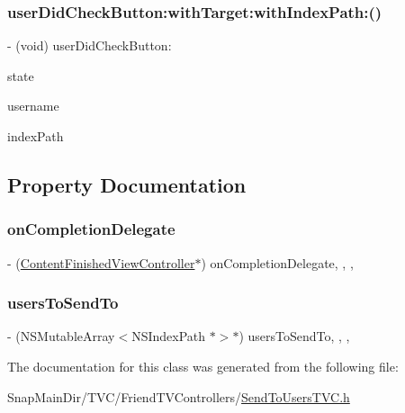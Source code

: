 \subsubsection{\texorpdfstring{user\+Did\+Check\+Button\+:with\+Target\+:with\+Index\+Path\+:()}{userDidCheckButton:withTarget:withIndexPath:()}}
{\footnotesize\ttfamily -\/ (void) user\+Did\+Check\+Button\+: \begin{DoxyParamCaption}\item[{(B\+O\+OL)}]{state }\item[{withTarget:(N\+S\+String $\ast$)}]{username }\item[{withIndexPath:(id)}]{index\+Path }\end{DoxyParamCaption}}



\subsection{Property Documentation}
\hypertarget{interface_send_to_users_t_v_c_a13d1910de12ac313b0455dfe96839d01}{}\label{interface_send_to_users_t_v_c_a13d1910de12ac313b0455dfe96839d01} 
\subsubsection{\texorpdfstring{on\+Completion\+Delegate}{onCompletionDelegate}}
{\footnotesize\ttfamily -\/ (\hyperlink{interface_content_finished_view_controller}{Content\+Finished\+View\+Controller}$\ast$) on\+Completion\+Delegate\hspace{0.3cm}{\ttfamily [read]}, {\ttfamily [write]}, {\ttfamily [nonatomic]}, {\ttfamily [weak]}}

\hypertarget{interface_send_to_users_t_v_c_a62d863a89cf9d45e9a9ae98724c69386}{}\label{interface_send_to_users_t_v_c_a62d863a89cf9d45e9a9ae98724c69386} 
\subsubsection{\texorpdfstring{users\+To\+Send\+To}{usersToSendTo}}
{\footnotesize\ttfamily -\/ (N\+S\+Mutable\+Array$<$N\+S\+Index\+Path $\ast$$>$$\ast$) users\+To\+Send\+To\hspace{0.3cm}{\ttfamily [read]}, {\ttfamily [write]}, {\ttfamily [nonatomic]}, {\ttfamily [strong]}}



The documentation for this class was generated from the following file\+:\begin{DoxyCompactItemize}
\item 
Snap\+Main\+Dir/\+T\+V\+C/\+Friend\+T\+V\+Controllers/\hyperlink{_send_to_users_t_v_c_8h}{Send\+To\+Users\+T\+V\+C.\+h}\end{DoxyCompactItemize}
